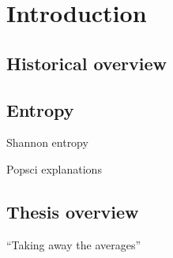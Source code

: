 \chapter{Introduction}

\section{Historical overview}




\section{Entropy}

Shannon entropy

Popsci explanations



\section{Thesis overview}

``Taking away the averages''